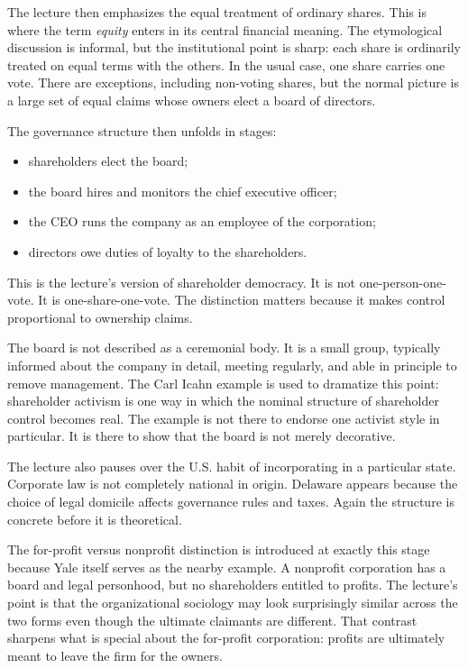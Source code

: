 The lecture then emphasizes the equal treatment of ordinary shares. This is where the term \emph{equity} enters in its central financial meaning. The etymological discussion is informal, but the institutional point is sharp: each share is ordinarily treated on equal terms with the others. In the usual case, one share carries one vote. There are exceptions, including non-voting shares, but the normal picture is a large set of equal claims whose owners elect a board of directors.

The governance structure then unfolds in stages:
\begin{itemize}
\item shareholders elect the board;
\item the board hires and monitors the chief executive officer;
\item the CEO runs the company as an employee of the corporation;
\item directors owe duties of loyalty to the shareholders.
\end{itemize}
This is the lecture's version of shareholder democracy. It is not one-person-one-vote. It is one-share-one-vote. The distinction matters because it makes control proportional to ownership claims.

The board is not described as a ceremonial body. It is a small group, typically informed about the company in detail, meeting regularly, and able in principle to remove management. The Carl Icahn example is used to dramatize this point: shareholder activism is one way in which the nominal structure of shareholder control becomes real. The example is not there to endorse one activist style in particular. It is there to show that the board is not merely decorative.

The lecture also pauses over the U.S. habit of incorporating in a particular state. Corporate law is not completely national in origin. Delaware appears because the choice of legal domicile affects governance rules and taxes. Again the structure is concrete before it is theoretical.

The for-profit versus nonprofit distinction is introduced at exactly this stage because Yale itself serves as the nearby example. A nonprofit corporation has a board and legal personhood, but no shareholders entitled to profits. The lecture's point is that the organizational sociology may look surprisingly similar across the two forms even though the ultimate claimants are different. That contrast sharpens what is special about the for-profit corporation: profits are ultimately meant to leave the firm for the owners.

